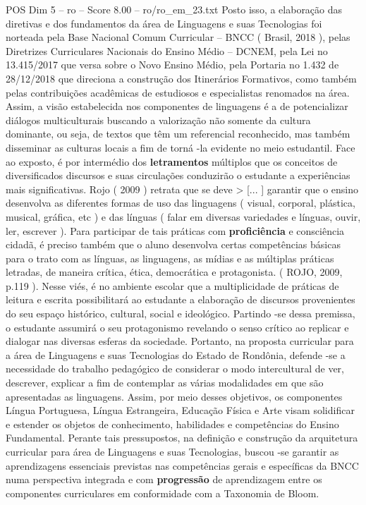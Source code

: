 \begin{textsample}{POS Dim 5 – ro – Score 8.00 – ro/ro\_em\_23.txt}
Posto isso, a elaboração das diretivas e dos fundamentos da área de Linguagens e suas Tecnologias foi norteada pela Base Nacional Comum Curricular – BNCC ( Brasil, 2018 ), pelas Diretrizes Curriculares Nacionais do Ensino Médio – DCNEM, pela Lei no 13.415/2017 que versa sobre o Novo Ensino Médio, pela Portaria no 1.432 de 28/12/2018 que direciona a construção dos Itinerários Formativos, como também pelas contribuições acadêmicas de estudiosos e especialistas renomados na área.
Assim, a visão estabelecida nos componentes de linguagens é a de potencializar diálogos multiculturais buscando a valorização não somente da cultura dominante, ou seja, de textos que têm um referencial reconhecido, mas também disseminar as culturas locais a fim de torná -la evidente no meio estudantil.
Face ao exposto, é por intermédio dos \textbf{letramentos} múltiplos que os conceitos de diversificados discursos e suas circulações conduzirão o estudante a experiências mais significativas.
Rojo ( 2009 ) retrata que se deve > [... ] garantir que o ensino desenvolva as diferentes formas de uso das linguagens ( visual, corporal, plástica, musical, gráfica, etc ) e das línguas ( falar em diversas variedades e línguas, ouvir, ler, escrever ).
Para participar de tais práticas com \textbf{proficiência} e consciência cidadã, é preciso também que o aluno desenvolva certas competências básicas para o trato com as línguas, as linguagens, as mídias e as múltiplas práticas letradas, de maneira crítica, ética, democrática e protagonista. ( ROJO, 2009, p.119 ).
Nesse viés, é no ambiente escolar que a multiplicidade de práticas de leitura e escrita possibilitará ao estudante a elaboração de discursos provenientes do seu espaço histórico, cultural, social e ideológico.
Partindo -se dessa premissa, o estudante assumirá o seu protagonismo revelando o senso crítico ao replicar e dialogar nas diversas esferas da sociedade.
Portanto, na proposta curricular para a área de Linguagens e suas Tecnologias do Estado de Rondônia, defende -se a necessidade do trabalho pedagógico de considerar o modo intercultural de ver, descrever, explicar a fim de contemplar as várias modalidades em que são apresentadas as linguagens.
Assim, por meio desses objetivos, os componentes Língua Portuguesa, Língua Estrangeira, Educação Física e Arte visam solidificar e estender os objetos de conhecimento, habilidades e competências do Ensino Fundamental.
Perante tais pressupostos, na definição e construção da arquitetura curricular para área de Linguagens e suas Tecnologias, buscou -se garantir as aprendizagens essenciais previstas nas competências gerais e específicas da BNCC numa perspectiva integrada e com \textbf{progressão} de aprendizagem entre os componentes curriculares em conformidade com a Taxonomia de Bloom.

\end{textsample}
